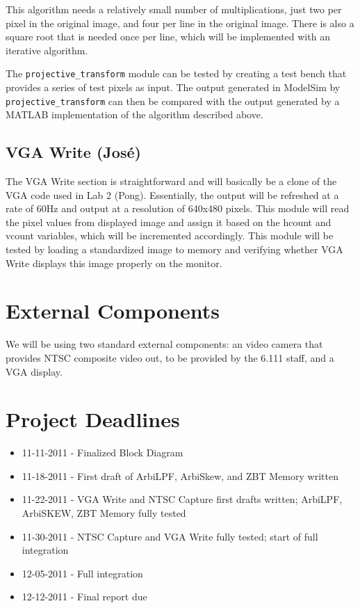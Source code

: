 \documentclass[10pt]{article}
\begin{document}
This algorithm needs a relatively small number of multiplications, just two per pixel in the original image, and four per line in the original image. There is also a square root that is needed once per line, which will be implemented with an iterative algorithm.

The {\tt projective\_transform} module can be tested by creating a test bench that provides a series of test pixels as input. The output generated in ModelSim by {\tt projective\_transform} can then be compared with the output generated by a MATLAB implementation of the algorithm described above.

\subsection{VGA Write (Jos\'{e})}
The VGA Write section is straightforward and will basically be a clone of the VGA code used in Lab 2 (Pong). Essentially, the output will be refreshed at a rate of 60Hz and output at a resolution of 640x480 pixels. This module will read the pixel values from displayed image and assign it based on the hcount and vcount variables, which will be incremented accordingly. This module will be tested by loading a standardized image to memory and verifying whether VGA Write displays this image properly on the monitor.

\section{External Components}
We will be using two standard external components: an video camera that provides NTSC composite video out, to be provided by the 6.111 staff, and a VGA display.

\section{Project Deadlines}
\begin{itemize}
\item 11-11-2011 - Finalized Block Diagram
\item 11-18-2011 - First draft of ArbiLPF, ArbiSkew, and ZBT Memory written
\item 11-22-2011 - VGA Write and NTSC Capture first drafts written; ArbiLPF, ArbiSKEW, ZBT Memory fully tested
\item 11-30-2011 - NTSC Capture and VGA Write fully tested; start of full integration
\item 12-05-2011 - Full integration
\item 12-12-2011 - Final report due
\end{itemize}
\end{document}
